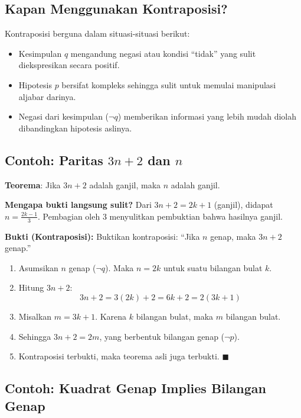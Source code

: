 \subsection{Kapan Menggunakan Kontraposisi?}

Kontraposisi berguna dalam situasi-situasi berikut:
\begin{itemize}
    \item Kesimpulan $q$ mengandung negasi atau kondisi ``tidak'' yang sulit diekspresikan secara positif.
    \item Hipotesis $p$ bersifat kompleks sehingga sulit untuk memulai manipulasi aljabar darinya.
    \item Negasi dari kesimpulan ($\neg q$) memberikan informasi yang lebih mudah diolah dibandingkan hipotesis aslinya.
\end{itemize}

\subsection{Contoh: Paritas \texorpdfstring{$3n+2$}{3n+2} dan \texorpdfstring{$n$}{n}}

\begin{contoh}
\textbf{Teorema}: Jika $3n+2$ adalah ganjil, maka $n$ adalah ganjil.

\textbf{Mengapa bukti langsung sulit?} Dari $3n+2 = 2k+1$ (ganjil), didapat $n = \frac{2k-1}{3}$. Pembagian oleh 3 menyulitkan pembuktian bahwa hasilnya ganjil.

\textbf{Bukti (Kontraposisi):} Buktikan kontraposisi: ``Jika $n$ genap, maka $3n+2$ genap.''

\begin{enumerate}
    \item Asumsikan $n$ genap ($\neg q$). Maka $n = 2k$ untuk suatu bilangan bulat $k$.
    \item Hitung $3n + 2$:
    \[ 3n + 2 = 3(2k) + 2 = 6k + 2 = 2(3k + 1) \]
    \item Misalkan $m = 3k + 1$. Karena $k$ bilangan bulat, maka $m$ bilangan bulat.
    \item Sehingga $3n + 2 = 2m$, yang berbentuk bilangan genap ($\neg p$).
    \item Kontraposisi terbukti, maka teorema asli juga terbukti. $\blacksquare$
\end{enumerate}
\end{contoh}

\subsection{Contoh: Kuadrat Genap Implies Bilangan Genap}


